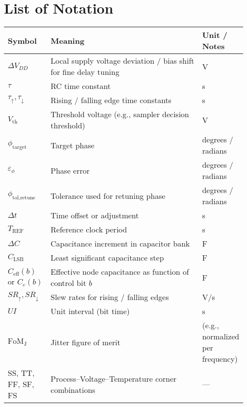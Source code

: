 \section*{List of Notation}
\begin{tabular}{p{0.18\linewidth} p{0.65\linewidth} p{0.15\linewidth}}
\textbf{Symbol} & \textbf{Meaning} & \textbf{Unit / Notes} \\
\hline
$\Delta V_{DD}$ & Local supply voltage deviation / bias shift for fine delay tuning & V \\
$\tau$ & RC time constant & s \\
$\tau_{\uparrow}, \tau_{\downarrow}$ & Rising / falling edge time constants & s \\
$V_{\text{th}}$ & Threshold voltage (e.g., sampler decision threshold) & V \\
$\phi_{\text{target}}$ & Target phase & degrees / radians \\
$\varepsilon_{\phi}$ & Phase error & degrees / radians \\
$\phi_{\text{tol,retune}}$ & Tolerance used for retuning phase & degrees / radians \\
$\Delta t$ & Time offset or adjustment & s \\
$T_{\text{REF}}$ & Reference clock period & s \\
$\Delta C$ & Capacitance increment in capacitor bank & F \\
$C_{\text{LSB}}$ & Least significant capacitance step & F \\
$C_{\text{eff}}(b)$ or $C_e(b)$ & Effective node capacitance as function of control bit $b$ & F \\
$SR_{\uparrow}, SR_{\downarrow}$ & Slew rates for rising / falling edges & V/s \\
$UI$ & Unit interval (bit time) & s \\
$\mathrm{FoM_J}$ & Jitter figure of merit & (e.g., normalized per frequency) \\
SS, TT, FF, SF, FS & Process–Voltage–Temperature corner combinations & --- \\
\end{tabular}
